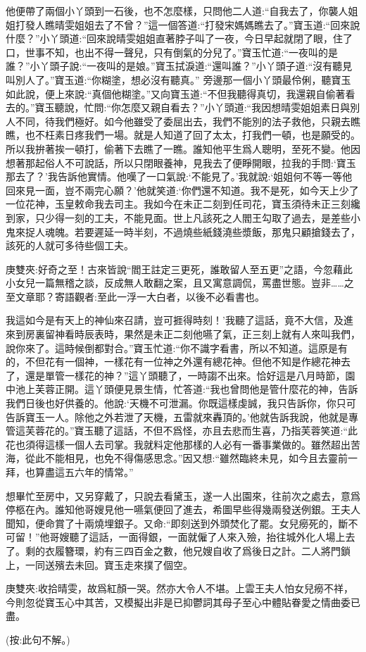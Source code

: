 \begin{parag}
    他便帶了兩個小丫頭到一石後，也不怎麼樣，只問他二人道:“自我去了，你襲人姐姐打發人瞧晴雯姐姐去了不曾？”這一個答道:“打發宋媽媽瞧去了。”寶玉道:“回來說什麼？”小丫頭道:“回來說晴雯姐姐直著脖子叫了一夜，今日早起就閉了眼，住了口，世事不知，也出不得一聲兒，只有倒氣的分兒了。”寶玉忙道:“一夜叫的是誰？”小丫頭子說:“一夜叫的是娘。”寶玉拭淚道:“還叫誰？”小丫頭子道:“沒有聽見叫別人了。”寶玉道:“你糊塗，想必沒有聽真。” 旁邊那一個小丫頭最伶俐，聽寶玉如此說，便上來說:“真個他糊塗。”又向寶玉道:“不但我聽得真切，我還親自偷著看去的。”寶玉聽說，忙問:“你怎麼又親自看去？”小丫頭道:“我因想晴雯姐姐素日與別人不同，待我們極好。如今他雖受了委屈出去，我們不能別的法子救他，只親去瞧瞧，也不枉素日疼我們一場。就是人知道了回了太太，打我們一頓，也是願受的。所以我拚著挨一頓打，偷著下去瞧了一瞧。誰知他平生爲人聰明，至死不變。他因想著那起俗人不可說話，所以只閉眼養神，見我去了便睜開眼，拉我的手問:‘寶玉那去了？’我告訴他實情。他嘆了一口氣說:‘不能見了。’我就說:‘姐姐何不等一等他回來見一面，豈不兩完心願？’他就笑道:‘你們還不知道。我不是死，如今天上少了一位花神，玉皇敕命我去司主。我如今在未正二刻到任司花，寶玉須待未正三刻纔到家，只少得一刻的工夫，不能見面。世上凡該死之人閻王勾取了過去，是差些小鬼來捉人魂魄。若要遲延一時半刻，不過燒些紙錢澆些漿飯，那鬼只顧搶錢去了，該死的人就可多待些個工夫。\begin{note}庚雙夾:好奇之至！古來皆說“閻王註定三更死，誰敢留人至五更”之語，今忽藉此小女兒一篇無稽之談，反成無人敢翻之案，且又寓意調侃，罵盡世態。豈非……之至文章耶？寄語觀者:至此一浮一大白者，以後不必看書也。\end{note}我這如今是有天上的神仙來召請，豈可捱得時刻！’我聽了這話，竟不大信，及進來到房裏留神看時辰表時，果然是未正二刻他嚥了氣，正三刻上就有人來叫我們，說你來了。這時候倒都對合。”寶玉忙道:“你不識字看書，所以不知道。這原是有的，不但花有一個神，一樣花有一位神之外還有總花神。但他不知是作總花神去了，還是單管一樣花的神？”這丫頭聽了，一時謅不出來。恰好這是八月時節，園中池上芙蓉正開。這丫頭便見景生情，忙答道:“我也曾問他是管什麼花的神，告訴我們日後也好供養的。他說:‘天機不可泄漏。你既這樣虔誠，我只告訴你，你只可告訴寶玉一人。除他之外若泄了天機，五雷就來轟頂的。’他就告訴我說，他就是專管這芙蓉花的。”寶玉聽了這話，不但不爲怪，亦且去悲而生喜，乃指芙蓉笑道:“此花也須得這樣一個人去司掌。我就料定他那樣的人必有一番事業做的。雖然超出苦海，從此不能相見，也免不得傷感思念。”因又想:“雖然臨終未見，如今且去靈前一拜，也算盡這五六年的情常。”
\end{parag}


\begin{parag}
    想畢忙至房中，又另穿戴了，只說去看黛玉，遂一人出園來，往前次之處去，意爲停柩在內。誰知他哥嫂見他一嚥氣便回了進去，希圖早些得幾兩發送例銀。王夫人聞知，便命賞了十兩燒埋銀子。又命:“即刻送到外頭焚化了罷。女兒癆死的，斷不可留！”他哥嫂聽了這話，一面得銀，一面就僱了人來入殮，抬往城外化人場上去了。剩的衣履簪環，約有三四百金之數，他兄嫂自收了爲後日之計。二人將門鎖上，一同送殯去未回。寶玉走來撲了個空。\begin{note}庚雙夾:收拾晴雯，故爲紅顏一哭。然亦大令人不堪。上雲王夫人怕女兒癆不祥，今則忽從寶玉心中其苦，又模擬出非是已抑鬱詞其母子至心中體貼眷愛之情曲委已盡。\end{note}(按:此句不解。)
\end{parag}


